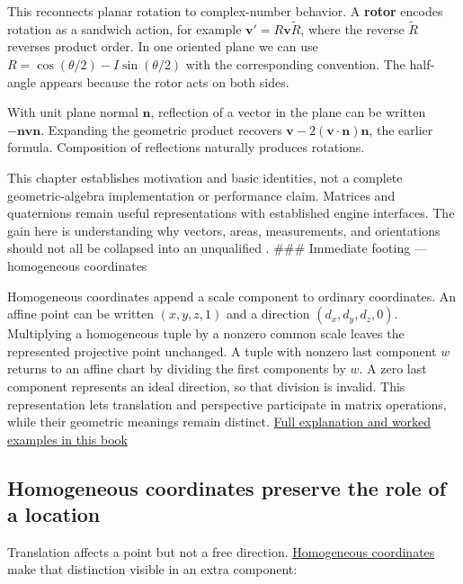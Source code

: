 This reconnects planar rotation to complex-number behavior. A \textbf{rotor} encodes rotation as a sandwich action, for example \(\mathbf v'=R\mathbf v\widetilde R\), where the reverse \(\widetilde R\) reverses product order. In one oriented plane we can use \(R=\cos(\theta/2)-I\sin(\theta/2)\) with the corresponding convention. The half-angle appears because the rotor acts on both sides.

With unit plane normal \(\mathbf n\), reflection of a vector in the plane can be written \(-\mathbf n\mathbf v\mathbf n\). Expanding the geometric product recovers \(\mathbf v-2(\mathbf v\cdot\mathbf n)\mathbf n\), the earlier formula. Composition of reflections naturally produces rotations.

This chapter establishes motivation and basic identities, not a complete geometric-algebra implementation or performance claim. Matrices and quaternions remain useful representations with established engine interfaces. The gain here is understanding why vectors, areas, measurements, and orientations should not all be collapsed into an unqualified . \#\#\# Immediate footing --- homogeneous coordinates

Homogeneous coordinates append a scale component to ordinary coordinates. An affine point can be written \((x,y,z,1)\) and a direction \((d_x,d_y,d_z,0)\). Multiplying a homogeneous tuple by a nonzero common scale leaves the represented projective point unchanged. A tuple with nonzero last component \(w\) returns to an affine chart by dividing the first components by \(w\). A zero last component represents an ideal direction, so that division is invalid. This representation lets translation and perspective participate in matrix operations, while their geometric meanings remain distinct. \hyperref[01-foundations-i-ch018-homogeneous-coordinates-preserve-the-role-of-a-location]{Full explanation and worked examples in this book}

\subsection{Homogeneous coordinates preserve the role of a location}\label{01-foundations-i-ch018-homogeneous-coordinates-preserve-the-role-of-a-location}

\hypertarget{01-foundations-i-ch018-homogeneous-coordinates-preserve-the-role-of-a-location}{}

Translation affects a point but not a free direction. \hyperref[01-foundations-i-ch019-figure-m6---follow-one-point-through-named-spaces]{Homogeneous coordinates} make that distinction visible in an extra component:

